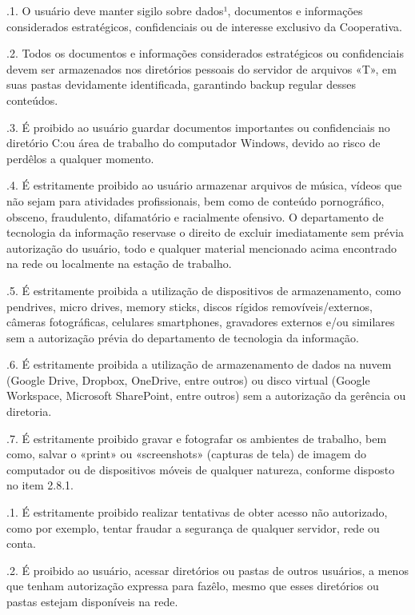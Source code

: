 \documentclass[letterpaper,10pt,portuges]{sphinxmanual}
\begin{document}
.1. O usuário deve manter sigilo sobre dados¹, documentos e informações considerados estratégicos, confidenciais ou de interesse exclusivo da Cooperativa.

.2. Todos os documentos e informações considerados estratégicos ou confidenciais devem ser armazenados nos diretórios pessoais do servidor de arquivos «T», em suas pastas devidamente identificada, garantindo backup regular desses conteúdos.

.3. É proibido ao usuário guardar documentos importantes ou confidenciais no diretório C:ou área de trabalho do computador Windows, devido ao risco de perdê\sphinxhyphen{}los a qualquer momento.

.4. É estritamente proibido ao usuário armazenar arquivos de música, vídeos que não sejam para atividades profissionais, bem como de conteúdo pornográfico, obsceno, fraudulento, difamatório e racialmente ofensivo. O departamento de tecnologia da informação reserva\sphinxhyphen{}se o direito de excluir imediatamente sem prévia autorização do usuário, todo e qualquer material mencionado acima encontrado na rede ou localmente na estação de trabalho.

.5. É estritamente proibida a utilização de dispositivos de armazenamento, como pendrives, micro drives, memory sticks, discos rígidos removíveis/externos, câmeras fotográficas, celulares smartphones, gravadores externos e/ou similares sem a autorização prévia do departamento de tecnologia da informação.

.6. É estritamente proibida a utilização de armazenamento de dados na nuvem (Google Drive, Dropbox, OneDrive, entre outros) ou disco virtual (Google Workspace, Microsoft SharePoint, entre outros) sem a autorização da gerência ou diretoria.

.7. É estritamente proibido gravar e fotografar os ambientes de trabalho, bem como, salvar o «print» ou «screenshots» (capturas de tela) de imagem do computador ou de dispositivos móveis de qualquer natureza, conforme disposto no item 2.8.1.

.1. É estritamente proibido realizar tentativas de obter acesso não autorizado, como por exemplo, tentar fraudar a segurança de qualquer servidor, rede ou conta.

.2. É proibido ao usuário, acessar diretórios ou pastas de outros usuários, a menos que tenham autorização expressa para fazê\sphinxhyphen{}lo, mesmo que esses diretórios ou pastas estejam disponíveis na rede.
\end{document}
